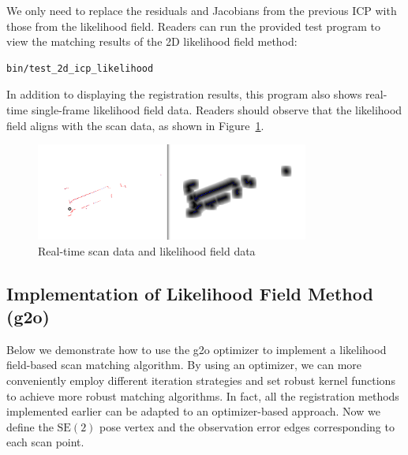 We only need to replace the residuals and Jacobians from the previous ICP with those from the likelihood field. Readers can run the provided test program to view the matching results of the 2D likelihood field method:  

\begin{lstlisting}[language=sh,caption=Terminal input:]  
bin/test_2d_icp_likelihood   
\end{lstlisting}  

In addition to displaying the registration results, this program also shows real-time single-frame likelihood field data. Readers should observe that the likelihood field aligns with the scan data, as shown in Figure~\ref{fig:scan-and-field}.  

\begin{figure}[!htp]  
	\centering  
	\includegraphics[width=0.8\textwidth]{resources/2d-lidar-mapping/ch6-scan-and-filed.png}  
	\caption{Real-time scan data and likelihood field data}  
	\label{fig:scan-and-field}  
\end{figure}

\subsection{Implementation of Likelihood Field Method (g2o)}
Below we demonstrate how to use the g2o optimizer \cite{Kummerle2011} to implement a likelihood field-based scan matching algorithm. By using an optimizer, we can more conveniently employ different iteration strategies and set robust kernel functions to achieve more robust matching algorithms. In fact, all the registration methods implemented earlier can be adapted to an optimizer-based approach. Now we define the $\mathrm{SE}(2)$ pose vertex and the observation error edges corresponding to each scan point.

